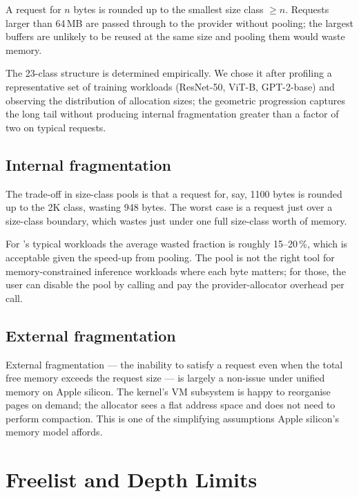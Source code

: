 A request for $n$ bytes is rounded up to the smallest size class
$\geq n$. Requests larger than 64\,MB are passed through to the
provider without pooling; the largest buffers are unlikely to be
reused at the same size and pooling them would waste memory.

The 23-class structure is determined empirically. We chose it after
profiling a representative set of training workloads (ResNet-50,
ViT-B, GPT-2-base) and observing the distribution of allocation
sizes; the geometric progression captures the long tail without
producing internal fragmentation greater than a factor of two on
typical requests.

\subsection{Internal fragmentation}
\label{ssec:allocator:internal_frag}

The trade-off in size-class pools is that a request for, say, 1100
bytes is rounded up to the 2K class, wasting 948 bytes. The worst
case is a request just over a size-class boundary, which wastes
just under one full size-class worth of memory.

For \Lucid's typical workloads the average wasted fraction is
roughly 15--20\,\%, which is acceptable given the speed-up from
pooling. The pool is not the right tool for memory-constrained
inference workloads where each byte matters; for those, the user
can disable the pool by calling 
and pay the provider-allocator overhead per call.

\subsection{External fragmentation}
\label{ssec:allocator:external_frag}

External fragmentation --- the inability to satisfy a request even
when the total free memory exceeds the request size --- is largely
a non-issue under unified memory on Apple silicon. The kernel's VM
subsystem is happy to reorganise pages on demand; the allocator
sees a flat address space and does not need to perform compaction.
This is one of the simplifying assumptions Apple silicon's memory
model affords.

\section{Freelist and Depth Limits}
\label{sec:allocator:freelists}

